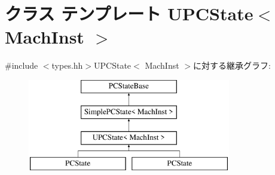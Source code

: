 \hypertarget{classGenericISA_1_1UPCState}{
\section{クラス テンプレート UPCState$<$ MachInst $>$}
\label{classGenericISA_1_1UPCState}
}


{\ttfamily \#include $<$types.hh$>$}UPCState$<$ MachInst $>$に対する継承グラフ:\begin{figure}[H]
\begin{center}
\leavevmode
\includegraphics[height=4cm]{classGenericISA_1_1UPCState}
\end{center}
\end{figure}
